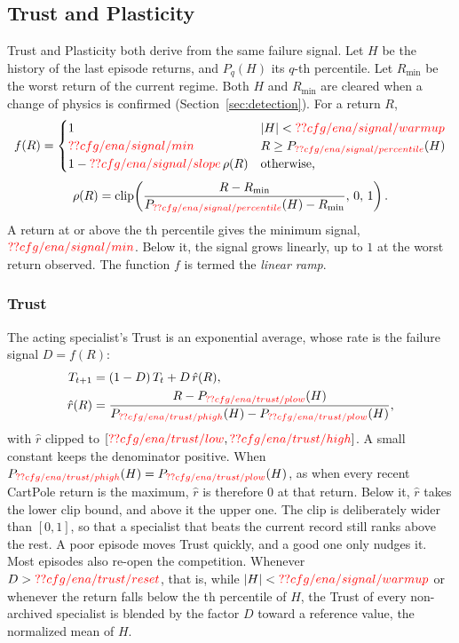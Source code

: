 \subsection{Trust and Plasticity}
\label{sec:trust}
Trust and Plasticity both derive from the same failure signal. Let $H$ be the history of the last  episode returns, and $P_{q}(H)$ its $q$-th percentile. Let $R_{\min}$ be the worst return of the current regime. Both $H$ and $R_{\min}$ are cleared when a change of physics is confirmed (Section~\ref{sec:detection}). For a return $R$,
\begin{equation}
f(R) =
\begin{cases}
1 & |H| < \Res{cfg/ena/signal/warmup} \\
\Res{cfg/ena/signal/min} & R \ge P_{\Res{cfg/ena/signal/percentile}}(H) \\
1 - \Res{cfg/ena/signal/slope}\,\rho(R) & \text{otherwise,}
\end{cases}
\label{eq:ramp}
\end{equation}
\begin{equation}
\rho(R) = \mathrm{clip}\!\left(\frac{R - R_{\min}}{P_{\Res{cfg/ena/signal/percentile}}(H) - R_{\min}},\, 0,\, 1\right).
\end{equation}
A return at or above the th percentile gives the minimum signal, $\Res{cfg/ena/signal/min}$. Below it, the signal grows linearly, up to $1$ at the worst return observed. The function $f$ is termed the \textit{linear ramp}.

\subsubsection{Trust}
The acting specialist's Trust is an exponential average, whose rate is the failure signal $D=f(R)$:
\begin{equation}
\begin{split}
T_{t+1} &= (1 - D)\,T_t + D\,\hat{r}(R), \\
\hat{r}(R) &= \frac{R - P_{\Res{cfg/ena/trust/plow}}(H)}{P_{\Res{cfg/ena/trust/phigh}}(H) - P_{\Res{cfg/ena/trust/plow}}(H)},
\end{split}
\label{eq:trust}
\end{equation}
with $\hat{r}$ clipped to $[\Res{cfg/ena/trust/low}, \Res{cfg/ena/trust/high}]$. A small constant keeps the denominator positive. When $P_{\Res{cfg/ena/trust/phigh}}(H) = P_{\Res{cfg/ena/trust/plow}}(H)$, as when every recent CartPole return is the maximum, $\hat{r}$ is therefore $0$ at that return. Below it, $\hat{r}$ takes the lower clip bound, and above it the upper one. The clip is deliberately wider than $[0,1]$, so that a specialist that beats the current record still ranks above the rest. A poor episode moves Trust quickly, and a good one only nudges it. Most episodes also re-open the competition. Whenever $D > \Res{cfg/ena/trust/reset}$, that is, while $|H| < \Res{cfg/ena/signal/warmup}$ or whenever the return falls below the th percentile of $H$, the Trust of every non-archived specialist is blended by the factor $D$ toward a reference value, the normalized mean of $H$.

